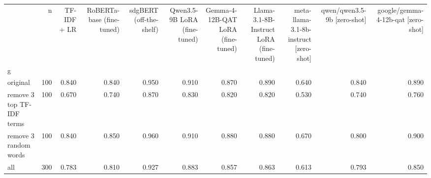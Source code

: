 \begin{tabular}{lrrrrrrrrrr}
\toprule
 & n & TF-IDF + LR & RoBERTa-base (fine-tuned) & sdgBERT (off-the-shelf) & Qwen3.5-9B LoRA (fine-tuned) & Gemma-4-12B-QAT LoRA (fine-tuned) & Llama-3.1-8B-Instruct LoRA (fine-tuned) & meta-llama-3.1-8b-instruct  [zero-shot] & qwen/qwen3.5-9b  [zero-shot] & google/gemma-4-12b-qat  [zero-shot] \\
g &  &  &  &  &  &  &  &  &  &  \\
\midrule
original & 100 & 0.840 & 0.840 & 0.950 & 0.910 & 0.870 & 0.890 & 0.640 & 0.840 & 0.890 \\
remove 3 top TF-IDF terms & 100 & 0.670 & 0.740 & 0.870 & 0.830 & 0.820 & 0.820 & 0.530 & 0.740 & 0.760 \\
remove 3 random words & 100 & 0.840 & 0.850 & 0.960 & 0.910 & 0.880 & 0.880 & 0.670 & 0.800 & 0.900 \\
all & 300 & 0.783 & 0.810 & 0.927 & 0.883 & 0.857 & 0.863 & 0.613 & 0.793 & 0.850 \\
\bottomrule
\end{tabular}
